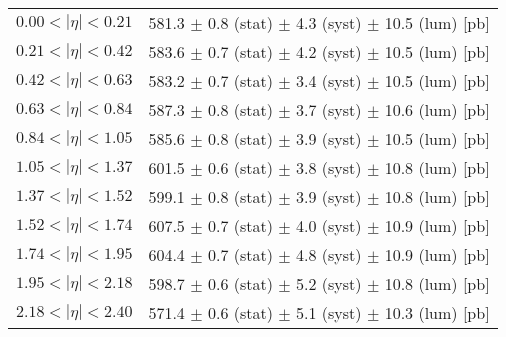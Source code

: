 \begin{tabular}{lc}
\hline
$0.00 < |\eta| <0.21$          & 581.3 $\pm$ 0.8 (stat) $\pm$ 4.3 (syst) $\pm$ 10.5 (lum) [pb]  \\
$0.21 < |\eta| <0.42$          & 583.6 $\pm$ 0.7 (stat) $\pm$ 4.2 (syst) $\pm$ 10.5 (lum) [pb]  \\
$0.42 < |\eta| <0.63$          & 583.2 $\pm$ 0.7 (stat) $\pm$ 3.4 (syst) $\pm$ 10.5 (lum) [pb]  \\
$0.63 < |\eta| <0.84$          & 587.3 $\pm$ 0.8 (stat) $\pm$ 3.7 (syst) $\pm$ 10.6 (lum) [pb]  \\
$0.84 < |\eta| <1.05$          & 585.6 $\pm$ 0.8 (stat) $\pm$ 3.9 (syst) $\pm$ 10.5 (lum) [pb]  \\
$1.05 < |\eta| <1.37$          & 601.5 $\pm$ 0.6 (stat) $\pm$ 3.8 (syst) $\pm$ 10.8 (lum) [pb]  \\
$1.37 < |\eta| <1.52$          & 599.1 $\pm$ 0.8 (stat) $\pm$ 3.9 (syst) $\pm$ 10.8 (lum) [pb]  \\
$1.52 < |\eta| <1.74$          & 607.5 $\pm$ 0.7 (stat) $\pm$ 4.0 (syst) $\pm$ 10.9 (lum) [pb]  \\
$1.74 < |\eta| <1.95$          & 604.4 $\pm$ 0.7 (stat) $\pm$ 4.8 (syst) $\pm$ 10.9 (lum) [pb]  \\
$1.95 < |\eta| <2.18$          & 598.7 $\pm$ 0.6 (stat) $\pm$ 5.2 (syst) $\pm$ 10.8 (lum) [pb]  \\
$2.18 < |\eta| <2.40$          & 571.4 $\pm$ 0.6 (stat) $\pm$ 5.1 (syst) $\pm$ 10.3 (lum) [pb]  \\
\hline
\end{tabular}
